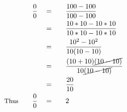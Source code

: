 \begin{alignat*}{5}
&\,&\frac{0}{0}\quad&=\quad&&\frac{100-100}{100-100}\\
&\,&\,&=&&\frac{10*10-10*10}{10*10-10*10}\\
&\,&\,&=&&\frac{10^2-10^2}{10(10-10)}\\
&\,&\,&=&&\frac{(10+10)\cancel{(10-10)}}{10\cancel{(10-10)}}\\
&\,&\,&=&&\frac{20}{10}\\
&\small\text{Thus}\normalsize\quad&\frac{0}{0}\quad&=&&2
\end{alignat*}
